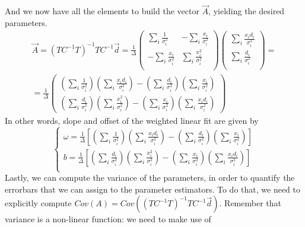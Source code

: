 \documentclass[a4paper,11pt,fleqn]{article}
\begin{document}
And we now have all the elements to build the vector $\vec{A}$, yielding the 
desired parameters.
\begin{gather*}
    \vec{A} = (TC^{-1}T)^{-1}TC^{-1}\vec{d} = \frac{1}{\Delta}
    \begin{pmatrix}
        \sum_i \frac{1}{\sigma_i^2} & -\sum_i \frac{x_i}{\sigma_i^2} \\
        -\sum_i \frac{x_i}{\sigma_i^2} & \sum_i \frac{x_i^2}{\sigma_i^2} \\
    \end{pmatrix}
    \begin{pmatrix}
        \sum_i \frac{x_i d_i}{\sigma_i^2} \\
        \sum_i \frac{d_i}{\sigma_i^2} \\
    \end{pmatrix} = \\ = \frac{1}{\Delta}
    \begin{pmatrix}
        \left(\sum_i\frac{1}{\sigma_i^2}\right)\left(\sum_i\frac{x_i d_i}{\sigma_i^2}\right) - \left(\sum_i\frac{d_i}{\sigma_i^2}\right)\left(\sum_i\frac{x_i}{\sigma_i^2}\right) \\
        \left(\sum_i\frac{d_i}{\sigma_i^2}\right) \left(\sum_i\frac{x_i^2}{\sigma_i^2}\right) - \left(\sum_i\frac{x_i}{\sigma_i^2}\right)\left(\sum_i\frac{x_i d_i}{\sigma_i^2}\right)
    \end{pmatrix}
\end{gather*}
In other words, slope and offset of the weighted linear fit are given by 
\begin{equation}
    \begin{cases}
        \omega = \frac{1}{\Delta} \left[\left(\sum_i\frac{1}{\sigma_i^2}\right)\left(\sum_i\frac{x_i d_i}{\sigma_i^2}\right) - \left(\sum_i\frac{d_i}{\sigma_i^2}\right)\left(\sum_i\frac{x_i}{\sigma_i^2}\right)\right] \\
        b = \frac{1}{\Delta} \left[ \left(\sum_i\frac{d_i}{\sigma_i^2}\right) \left(\sum_i\frac{x_i^2}{\sigma_i^2}\right) - \left(\sum_i\frac{x_i}{\sigma_i^2}\right)\left(\sum_i\frac{x_i d_i}{\sigma_i^2}\right)\right] \\
    \end{cases}
\end{equation}
Lastly, we can compute the variance of the parameters, in order to quantify
the errorbars that we can assign to the parameter estimators. To do that, 
we need to explicitly compute $Cov(A) = Cov((TC^{-1}T)^{-1}TC^{-1}\vec{d})$.
Remember that variance is a non-linear function: we need to make use of 
\end{document}
